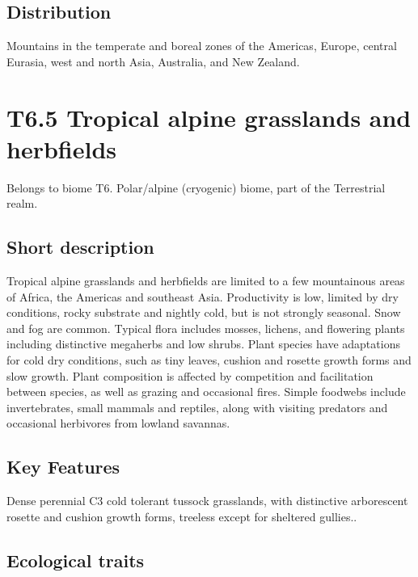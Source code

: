 \documentclass[
  letterpaper,
  DIV=11,
  numbers=noendperiod]{scrartcl}
\begin{document}
\subsection{Distribution}\label{distribution-96}

Mountains in the temperate and boreal zones of the Americas, Europe,
central Eurasia, west and north Asia, Australia, and New Zealand.

\section{T6.5 Tropical alpine grasslands and
herbfields}\label{t6.5-tropical-alpine-grasslands-and-herbfields}

Belongs to biome T6. Polar/alpine (cryogenic) biome, part of the
Terrestrial realm.

\subsection{Short description}\label{short-description-97}

Tropical alpine grasslands and herbfields are limited to a few
mountainous areas of Africa, the Americas and southeast Asia.
Productivity is low, limited by dry conditions, rocky substrate and
nightly cold, but is not strongly seasonal. Snow and fog are common.
Typical flora includes mosses, lichens, and flowering plants including
distinctive megaherbs and low shrubs. Plant species have adaptations for
cold dry conditions, such as tiny leaves, cushion and rosette growth
forms and slow growth. Plant composition is affected by competition and
facilitation between species, as well as grazing and occasional fires.
Simple foodwebs include invertebrates, small mammals and reptiles, along
with visiting predators and occasional herbivores from lowland savannas.

\subsection{Key Features}\label{key-features-97}

Dense perennial C3 cold tolerant tussock grasslands, with distinctive
arborescent rosette and cushion growth forms, treeless except for
sheltered gullies..

\subsection{Ecological traits}\label{ecological-traits-97}
\end{document}
